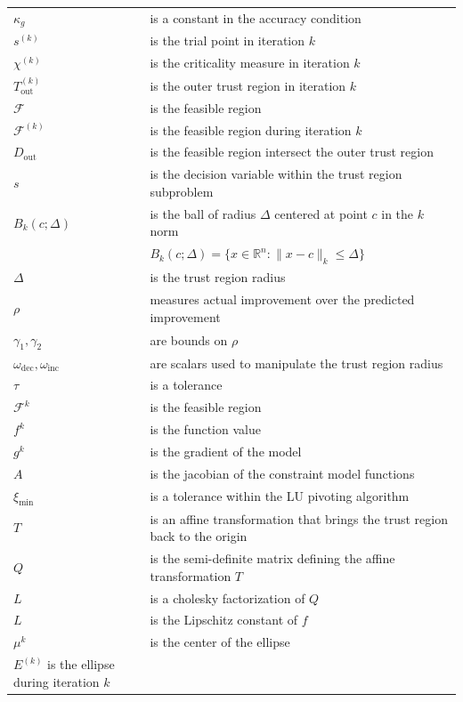 \documentclass{article}
\theoremstyle{case}
\newcommand{\sk}{{{s}^{(k)}}}
\newcommand{\outertrk}{{T_{\text{out}}^{(k)}}}
\newcommand{\feasible}{{\mathcal F}}
\newcommand{\feasiblek}{{\mathcal F^{(k)}}}
\newcommand{\ellipsek}{{E^{(k)}}}
\newcommand{\chik}{{\chi^{(k)}}}
\newcommand{\innerfritr}{D_{\text{in}}}
\newcommand{\outerfritr}{D_{\text{out}}}
\begin{document}
\begin{longtable}{| p{} | p{} |}
$\kappa_{g}$ & is a constant in the accuracy condition \\
$\sk$ & is the trial point in iteration $k$ \\
$\chik$ & is the criticality measure in iteration $k$ \\
$\outertrk$ & is the outer trust region in iteration $k$ \\
$\feasible$ & is the feasible region \\
$\feasiblek$ & is the feasible region during iteration $k$ \\
$\outerfritr$ & is the feasible region intersect the outer trust region \\
$s$ & is the decision variable within the trust region subproblem \\
$B_k(c; \Delta)$ & is the ball of radius $\Delta$ centered at point $c$ in the $k$ norm\\
& $B_k(c;\Delta) = \{ x \in \mathbb{R}^n : \| x - c\|_k \le \Delta \}$ \\
$\Delta$ & is the trust region radius \\
$\rho$ & measures actual improvement over the predicted improvement \\
$\gamma_1, \gamma_2$ &  are bounds on $\rho$ \\
$\omega_{\text{dec}}, \omega_{\text{inc}}$ & are scalars used to manipulate the trust region radius \\
$\tau$ & is a tolerance \\
$\mathcal{F}^k$ & is the feasible region \\
$f^k$ & is the function value \\
$g^k$ & is the gradient of the model \\
$A$ & is the jacobian of the constraint model functions \\
$\xi_{\text{min}}$ & is a tolerance within the LU pivoting algorithm \\
$T$ & is an affine transformation that brings the trust region back to the origin \\
$Q$ & is the semi-definite matrix defining the affine transformation $T$ \\
$L$ & is a cholesky factorization of $Q$ \\
$L$ & is the Lipschitz constant of $f$ \\
$\mu^k$ & is the center of the ellipse \\
$\ellipsek$ is the ellipse during iteration $k$ \\

\end{longtable}
\end{document}
